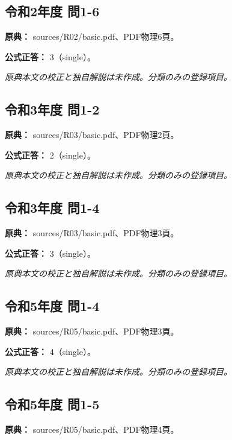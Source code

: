 \subsection{令和2年度 問1-6}
\label{q:r02-reg-basic-1-6}

\noindent\textbf{原典：} sources/R02/basic.pdf、PDF物理6頁。

\textbf{公式正答：} 3（single）。

\par\textit{原典本文の校正と独自解説は未作成。分類のみの登録項目。}

\subsection{令和3年度 問1-2}
\label{q:r03-reg-basic-1-2}

\noindent\textbf{原典：} sources/R03/basic.pdf、PDF物理2頁。

\textbf{公式正答：} 2（single）。

\par\textit{原典本文の校正と独自解説は未作成。分類のみの登録項目。}

\subsection{令和3年度 問1-4}
\label{q:r03-reg-basic-1-4}

\noindent\textbf{原典：} sources/R03/basic.pdf、PDF物理3頁。

\textbf{公式正答：} 3（single）。

\par\textit{原典本文の校正と独自解説は未作成。分類のみの登録項目。}

\subsection{令和5年度 問1-4}
\label{q:r05-reg-basic-1-4}

\noindent\textbf{原典：} sources/R05/basic.pdf、PDF物理3頁。

\textbf{公式正答：} 4（single）。

\par\textit{原典本文の校正と独自解説は未作成。分類のみの登録項目。}

\subsection{令和5年度 問1-5}
\label{q:r05-reg-basic-1-5}

\noindent\textbf{原典：} sources/R05/basic.pdf、PDF物理4頁。

